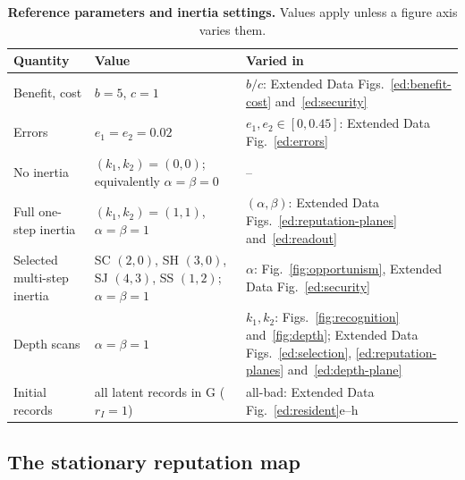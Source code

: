 \documentclass[fleqn,10pt]{wlscirep}
\theoremstyle{plain}
\begin{document}
\begin{table}[!htbp]
\centering
\caption{\textbf{Reference parameters and inertia settings.} Values apply unless a figure axis varies them.}
\label{tab:si-parameters}
\small
\begin{tabular}{@{}lll@{}}
\toprule
Quantity & Value & Varied in\\
\midrule
Benefit, cost & $b=5$, $c=1$ & $b/c$: Extended Data Figs.~\ref{ed:benefit-cost} and~\ref{ed:security}\\
Errors & $e_1=e_2=0.02$ & $e_1,e_2\in[0,0.45]$: Extended Data Fig.~\ref{ed:errors}\\
No inertia & $(k_1,k_2)=(0,0)$; equivalently $\alpha=\beta=0$ & --\\
Full one-step inertia & $(k_1,k_2)=(1,1)$, $\alpha=\beta=1$ & $(\alpha,\beta)$: Extended Data Figs.~\ref{ed:reputation-planes} and~\ref{ed:readout}\\
Selected multi-step inertia & SC $(2,0)$, SH $(3,0)$, SJ $(4,3)$, SS $(1,2)$; $\alpha=\beta=1$ & $\alpha$: Fig.~\ref{fig:opportunism}, Extended Data Fig.~\ref{ed:security}\\
Depth scans & $\alpha=\beta=1$ & $k_1,k_2$: Figs.~\ref{fig:recognition} and~\ref{fig:depth}; Extended Data Figs.~\ref{ed:selection}, \ref{ed:reputation-planes} and~\ref{ed:depth-plane}\\
Initial records & all latent records in G ($r_I=1$) & all-bad: Extended Data Fig.~\ref{ed:resident}e--h\\
\bottomrule
\end{tabular}
\end{table}

\subsection{The stationary reputation map}
\label{si:map}
\end{document}
